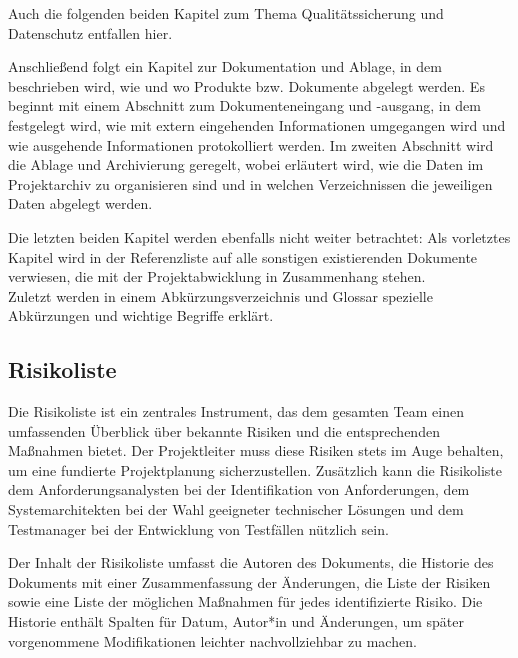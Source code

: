Auch die folgenden beiden Kapitel zum Thema Qualitätssicherung und Datenschutz entfallen hier.

Anschließend folgt ein Kapitel zur Dokumentation und Ablage, in dem beschrieben wird, wie und wo Produkte 
bzw. Dokumente abgelegt werden. Es beginnt mit einem Abschnitt zum Dokumenteneingang und -ausgang, in dem 
festgelegt wird, wie mit extern eingehenden Informationen umgegangen wird und wie ausgehende Informationen 
protokolliert werden. Im zweiten Abschnitt wird die Ablage und Archivierung geregelt, wobei erläutert wird, 
wie die Daten im Projektarchiv zu organisieren sind und in welchen Verzeichnissen die jeweiligen Daten 
abgelegt werden.

Die letzten beiden Kapitel werden ebenfalls nicht weiter betrachtet:
Als vorletztes Kapitel wird in der Referenzliste auf alle sonstigen existierenden Dokumente verwiesen, 
die mit der Projektabwicklung in Zusammenhang stehen.\\
Zuletzt werden in einem Abkürzungsverzeichnis und Glossar spezielle Abkürzungen und wichtige Begriffe erklärt.

\subsection{Risikoliste}  \label{Risikoliste}

Die Risikoliste ist ein zentrales Instrument, das dem gesamten Team einen umfassenden Überblick über bekannte Risiken 
und die entsprechenden Maßnahmen bietet. Der Projektleiter muss diese Risiken stets im Auge behalten, um eine 
fundierte Projektplanung sicherzustellen. Zusätzlich kann die Risikoliste dem Anforderungsanalysten bei der 
Identifikation von Anforderungen, dem Systemarchitekten bei der Wahl geeigneter technischer Lösungen und dem 
Testmanager bei der Entwicklung von Testfällen nützlich sein.

Der Inhalt der Risikoliste umfasst die Autoren des Dokuments, die Historie des Dokuments mit einer Zusammenfassung 
der Änderungen, die Liste der Risiken sowie eine Liste der möglichen Maßnahmen für jedes identifizierte Risiko. 
Die Historie enthält Spalten für Datum, Autor*in und Änderungen, um später vorgenommene Modifikationen leichter 
nachvollziehbar zu machen.

